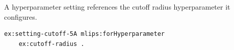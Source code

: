 A hyperparameter setting references the cutoff radius hyperparameter it configures.
\begin{lstlisting}[language=turtle]
ex:setting-cutoff-5A mlips:forHyperparameter
    ex:cutoff-radius .
\end{lstlisting}
